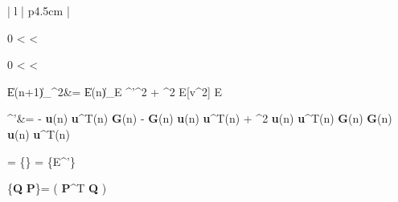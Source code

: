 \documentclass[journal, one column]{IEEEtran}
\begin{document}
\begin{table}[h!]
\begin{tabular}{ | l | p{4.5cm} |}
\begin{split}
\end{split}
\label{eq2.5}
\begin{split}
0 < \mu < 
\end{split}
\label{eq2.6}
\begin{split}
0 < \mu < 
\end{split}
\label{eq2.7}
\begin{split}
E\|(n+1)\|_{\boldsymbol{\Sigma}}^{2}&= E\|(n)\|_{E \boldsymbol{\Sigma}^{'}}^{2}
+ \mu^{2} \hspace{0.2em} E[v^{2}] \hspace{0.2em} E
\end{split}
\label{eq2.8}
\begin{split}
\boldsymbol{\Sigma}^{'}&= \boldsymbol{\Sigma} - \mu \hspace{0.2em} \textbf{u}(n) \textbf{u}^{T}(n) \hspace{0.2em} \textbf{G}(n) \hspace{0.2em} \boldsymbol{\Sigma} - \mu \hspace{0.2em} \boldsymbol{\Sigma} \hspace{0.2em} \textbf{G}(n) \hspace{0.2em} \textbf{u}(n) \textbf{u}^{T}(n) + \mu^{2} \hspace{0.2em} \textbf{u}(n) \textbf{u}^{T}(n) \hspace{0.2em} \textbf{G}(n) \hspace{0.2em} \boldsymbol{\Sigma}  \hspace{0.3em} \textbf{G}(n) \hspace{0.2em} \textbf{u}(n) \textbf{u}^{T}(n)\\
\end{split}
\label{eq2.9}
\begin{split}
\boldsymbol{\sigma}= \{\boldsymbol{\Sigma}\} \hspace{2em}  \hspace{2em} = \{E\boldsymbol{\Sigma}^{'}\}
\end{split}
\label{eq2.10}
\begin{split}
\{\textbf{Q} \boldsymbol{\Sigma} \textbf{P}\}= ( \textbf{P}^{T} \otimes \textbf{Q} ) \hspace{0.2em} \boldsymbol{\sigma}

\end{split}
\end{tabular}
\end{table}
\end{document}
